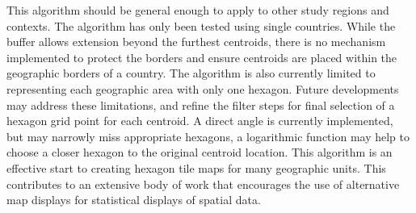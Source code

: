 This algorithm should be general enough to apply to other study regions
and contexts. The algorithm has only been tested using single countries.
While the buffer allows extension beyond the furthest centroids, there
is no mechanism implemented to protect the borders and ensure centroids
are placed within the geographic borders of a country. The algorithm is
also currently limited to representing each geographic area with only
one hexagon. Future developments may address these limitations, and
refine the filter steps for final selection of a hexagon grid point for
each centroid. A direct angle is currently implemented, but may narrowly
miss appropriate hexagons, a logarithmic function may help to choose a
closer hexagon to the original centroid location. This algorithm is an
effective start to creating hexagon tile maps for many geographic units.
This contributes to an extensive body of work that encourages the use of
alternative map displays for statistical displays of spatial data.



\address{%
Stephanie Kobakian\\
Monash University\\%
Department of Econometrics and Business Statistics\\
%
%
%
\\\href{mailto:stephanie.kobakian@monash.edu}{\nolinkurl{stephanie.kobakian@monash.edu}}
}

\address{%
Dianne Cook\\
Monash University\\%
Department of Econometrics and Business Statistics\\
%
%
%
\\\href{mailto:dicook@monash.edu}{\nolinkurl{dicook@monash.edu}}
}

\address{%
Earl Duncan\\
Queensland University of Technology\\%
School of Mathematical Sciences\\
%
%
%
\\\href{mailto:earl.duncan@qut.edu.au}{\nolinkurl{earl.duncan@qut.edu.au}}
}

